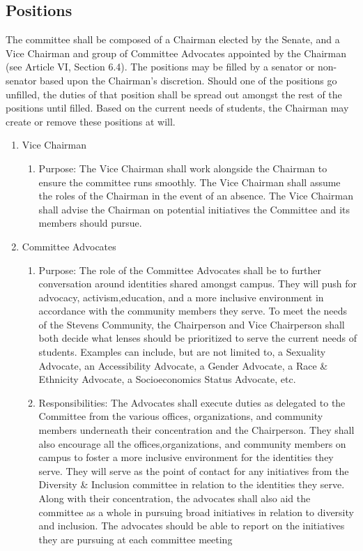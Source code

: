 \documentclass[12pt]{scrreprt}
\begin{document}
\subsection{Positions}
The committee shall be composed of a Chairman elected by the Senate, and a Vice Chairman and
group of Committee Advocates appointed by the Chairman (see Article VI, Section 6.4). The
positions may be filled by a senator or non-senator based upon the Chairman’s discretion. Should
one of the positions go unfilled, the duties of that position shall be spread out amongst the rest of
the positions until filled. Based on the current needs of students, the Chairman may create or
remove these positions at will.
\begin{enumerate}
    \item Vice Chairman
\begin{enumerate}
    \item Purpose: The Vice Chairman shall work alongside the Chairman to ensure the committee runs
smoothly. The Vice Chairman shall assume the roles of the Chairman in the event of an
absence. The Vice Chairman shall advise the Chairman on potential initiatives the
Committee and its members should pursue.
    \end{enumerate}
    \item Committee Advocates
    \begin{enumerate}
        \item Purpose: The role of the Committee Advocates shall be to further conversation around identities shared amongst campus. They will push for advocacy, activism,education, and a more inclusive environment in accordance with the community members they serve. To meet the needs of the Stevens Community, the Chairperson and Vice Chairperson shall both decide what lenses should be prioritized to serve the current needs of students. Examples can include, but are not limited to, a Sexuality Advocate, an Accessibility Advocate, a Gender Advocate, a Race & Ethnicity Advocate, a Socioeconomics Status Advocate, etc.
        \item Responsibilities: The Advocates shall execute duties as delegated to the Committee from the various offices, organizations, and community members underneath their concentration and the Chairperson. They shall also encourage all the offices,organizations, and community members on campus to foster a more inclusive environment for the identities they serve.  They will serve as the point of contact for any initiatives from the Diversity & Inclusion committee in relation to the identities they serve. Along with their concentration, the advocates shall also aid the committee as a whole in pursuing broad initiatives in relation to diversity and inclusion.​ The advocates should be able to report on the initiatives they are pursuing at each committee meeting 
\end{enumerate}
\end{enumerate}
\end{document}
